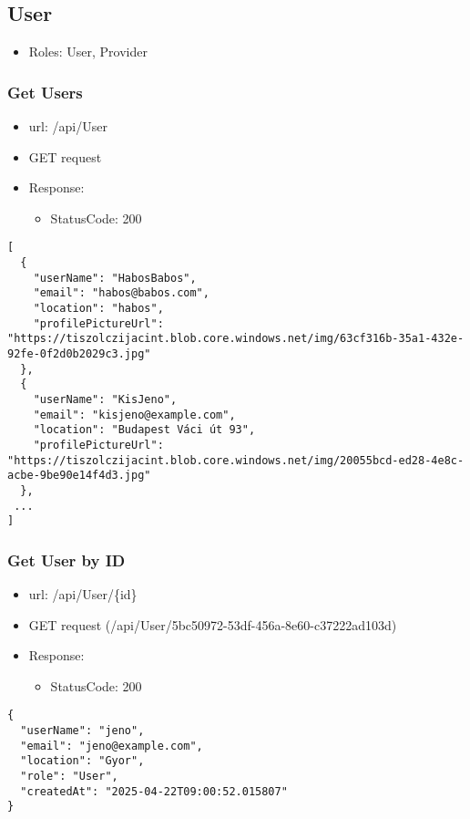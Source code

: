 \documentclass[11pt]{article}
\begin{document}
\subsection{User}
\label{sec:org20b577b}
\begin{itemize}
\item Roles: User, Provider
\end{itemize}
\subsubsection{Get Users}
\label{sec:orga825bfc}
\begin{itemize}
\item url: /api/User
\item GET request
\item Response:
\begin{itemize}
\item StatusCode: 200
\end{itemize}
\end{itemize}
\begin{verbatim}
[
  {
    "userName": "HabosBabos",
    "email": "habos@babos.com",
    "location": "habos",
    "profilePictureUrl": "https://tiszolczijacint.blob.core.windows.net/img/63cf316b-35a1-432e-92fe-0f2d0b2029c3.jpg"
  },
  {
    "userName": "KisJeno",
    "email": "kisjeno@example.com",
    "location": "Budapest Váci út 93",
    "profilePictureUrl": "https://tiszolczijacint.blob.core.windows.net/img/20055bcd-ed28-4e8c-acbe-9be90e14f4d3.jpg"
  },
 ...
]
\end{verbatim}
\subsubsection{Get User by ID}
\label{sec:orgaa7b140}
\begin{itemize}
\item url: /api/User/\{id\}
\item GET request (/api/User/5bc50972-53df-456a-8e60-c37222ad103d)
\item Response:
\begin{itemize}
\item StatusCode: 200
\end{itemize}
\end{itemize}
\begin{verbatim}
{
  "userName": "jeno",
  "email": "jeno@example.com",
  "location": "Gyor",
  "role": "User",
  "createdAt": "2025-04-22T09:00:52.015807"
}
\end{verbatim}
\end{document}
